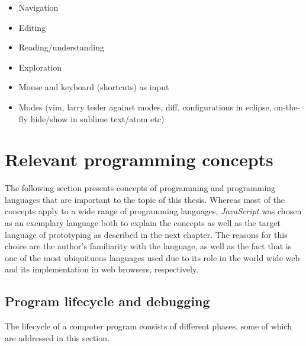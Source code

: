 \begin{itemize}
\itemsep1pt\parskip0pt
\item
  Navigation
\item
  Editing
\item
  Reading/understanding
\item
  Exploration
\item
  Mouse and keyboard (shortcuts) as input
\item
  Modes (vim, larry tesler against modes, diff. configurations in
  eclipse, on-the-fly hide/show in sublime text/atom etc)
\end{itemize}

\section{Relevant programming
concepts}\label{relevant-programming-concepts}

The following section presents concepts of programming and programming
languages that are important to the topic of this thesis. Whereas most
of the concepts apply to a wide range of programming languages,
\emph{JavaScript} was chosen as an exemplary language both to explain
the concepts as well as the target language of prototyping as described
in the next chapter. The reasons for this choice are the author’s
familiarity with the language, as well as the fact that is one of the
most ubiquituous languages used due to its role in the world wide web
and its implementation in web browsers, respectively.

\subsection{Program lifecycle and
debugging}\label{program-lifecycle-and-debugging}

The lifecycle of a computer program consists of different phases, some
of which are addressed in this section.

